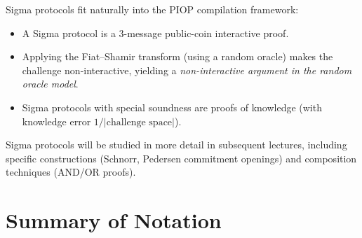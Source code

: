 \documentclass[11pt]{article}
\begin{document}
Sigma protocols fit naturally into the PIOP compilation framework:
\begin{itemize}
  \item A Sigma protocol is a 3-message public-coin interactive proof.
  \item Applying the Fiat--Shamir transform (using a random oracle) makes the challenge
    non-interactive, yielding a \emph{non-interactive argument in the random oracle model}.
  \item Sigma protocols with special soundness are proofs of knowledge (with knowledge
    error $1/|\text{challenge space}|$).
\end{itemize}

Sigma protocols will be studied in more detail in subsequent lectures, including specific
constructions (Schnorr, Pedersen commitment openings) and composition techniques
(AND/OR proofs).

\appendix
\section*{Summary of Notation}
\end{document}
